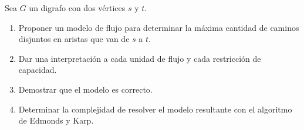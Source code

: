 
 \item Sea $G$ un digrafo con dos vértices $s$ y $t$.
 \begin{enumerate}[label=$\alph*)$,ref=$\alph*)$]
  \item Proponer un modelo de flujo para determinar la máxima cantidad de caminos disjuntos en aristas que van de $s$ a $t$.
  \item Dar una interpretación a cada unidad de flujo y cada restricción de capacidad.
  \item Demostrar que el modelo es correcto.
  \item Determinar la complejidad de resolver el modelo resultante con el algoritmo de Edmonds y Karp.
 \end{enumerate}

